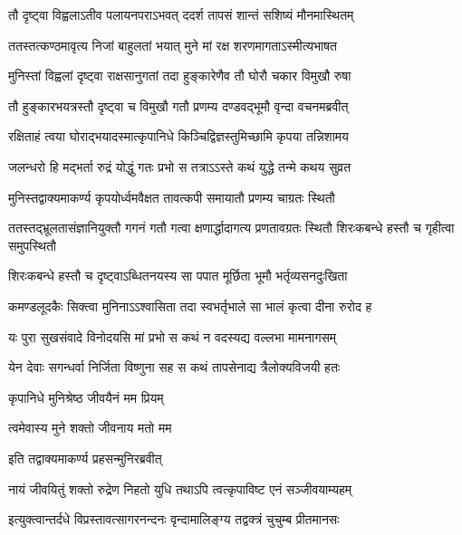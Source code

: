\twolineshloka
{तौ दृष्ट्वा विह्वलाऽतीव पलायनपराऽभवत्}
{ददर्श तापसं शान्तं सशिष्यं मौनमास्थितम्} %

\twolineshloka
{ततस्तत्कण्ठमावृत्य निजां बाहुलतां भयात्}
{मुने मां रक्ष शरणमागताऽस्मीत्यभाषत} %

\twolineshloka
{मुनिस्तां विह्वलां दृष्ट्वा राक्षसानुगतां तदा}
{हुङ्कारेणैव तौ घोरौ चकार विमुखौ रुषा} %

\twolineshloka
{तौ हुङ्कारभयत्रस्तौ दृष्ट्वा च विमुखौ गतौ}
{प्रणम्य दण्डवद्भूमौ वृन्दा वचनमब्रवीत्} %


\twolineshloka
{रक्षिताहं त्वया घोराद्भयादस्मात्कृपानिधे}
{किञ्चिद्विज्ञस्तुमिच्छामि कृपया तन्निशामय} %

\twolineshloka
{जलन्धरो हि मद्भर्ता रुद्रं योद्धुं गतः प्रभो}
{स तत्राऽऽस्ते कथं युद्धे तन्मे कथय सुव्रत} %


\twolineshloka
{मुनिस्तद्वाक्यमाकर्ण्य कृपयोर्ध्वमवैक्षत}
{तावत्कपी समायातौ प्रणम्य चाग्रतः स्थितौ} %

\threelineshloka
{ततस्तद्भ्रूलतासंज्ञानियुक्तौ गगनं गतौ}
{गत्वा क्षणार्द्धादागत्य प्रणतावग्रतः स्थितौ}
{शिरःकबन्धे हस्तौ च गृहीत्वा समुपस्थितौ} %

\twolineshloka
{शिरःकबन्धे हस्तौ च दृष्ट्वाऽब्धितनयस्य सा}
{पपात मूर्छिता भूमौ भर्तृव्यसनदुःखिता} %

\twolineshloka
{कमण्डलूदकैः सिक्त्वा मुनिनाऽऽश्वासिता तदा}
{स्वभर्तृभाले सा भालं कृत्वा दीना रुरोद ह} %


\twolineshloka
{यः पुरा सुखसंवादे विनोदयसि मां प्रभो}
{स कथं न वदस्यद्य वल्लभा मामनागसम्} %

\twolineshloka
{येन देवाः सगन्धर्वा निर्जिता विष्णुना सह}
{स कथं तापसेनाद्य त्रैलोक्यविजयी हतः} %





\onelineshloka
{कृपानिधे मुनिश्रेष्ठ जीवयैनं मम प्रियम्} %


त्वमेवास्य मुने शक्तो जीवनाय मतो मम


\onelineshloka
{इति तद्वाक्यमाकर्ण्य प्रहसन्मुनिरब्रवीत्} %


\twolineshloka
{नायं जीवयितुं शक्तो रुद्रेण निहतो युधि}
{तथाऽपि त्वत्कृपाविष्ट एनं सञ्जीवयाम्यहम्} %


\twolineshloka
{इत्युक्त्वान्तर्दधे विप्रस्तावत्सागरनन्दनः}
{वृन्दामालिङ्ग्य तद्वक्त्रं चुचुम्ब प्रीतमानसः} %

